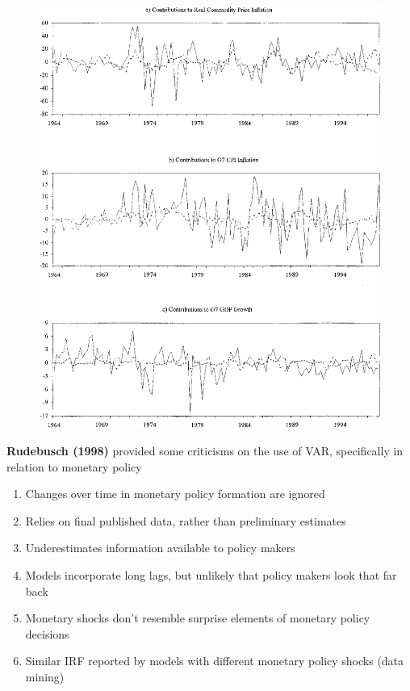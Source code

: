\documentclass{beamer}
\begin{document}
\begin{frame}
  \begin{figure}
    \includegraphics[scale=.2]{brunner5.eps}
  \end{figure}
\end{frame}

\begin{frame}
  \textbf{Rudebusch (1998)} provided some criticisms on the use of VAR, specifically in relation to monetary policy
  \medskip
  \begin{enumerate}
    \item Changes over time in monetary policy formation are ignored
    \item Relies on final published data, rather than preliminary estimates
    \item Underestimates information available to policy makers
    \item Models incorporate long lags, but unlikely that policy makers look that far back
    \item Monetary shocks don't resemble surprise elements of monetary policy decisions
    \item Similar IRF reported by models with different monetary policy shocks (data mining)
  \end{enumerate}
\end{frame}
\end{document}
